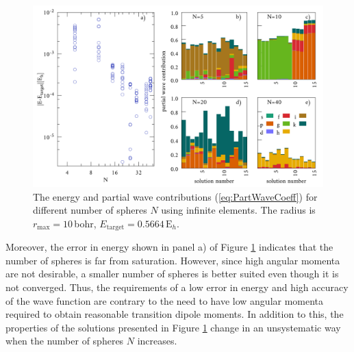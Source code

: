 \begin{figure}[h]
\includegraphics[width=\textwidth]{Figures/BC/NumInfEL}
\caption{The energy and partial wave contributions (\ref{eq:PartWaveCoeff}) for different number of spheres $N$ using infinite elements. The radius is $r_\text{max}=10\,$bohr, $E_\text{target}=0.5664\,\text{E}_h$.}
\label{fig:InfNum}
\end{figure}
Moreover, the error in energy shown in panel a) of Figure \ref{fig:InfNum} indicates that the number of spheres is far from saturation.
However, since high angular momenta are not desirable, a smaller number of spheres is better suited even though it is not converged.
Thus, the requirements of a low error in energy and high accuracy of the wave function are contrary to the need to have low angular momenta required to obtain reasonable transition dipole moments.
In addition to this, the properties of the solutions presented in Figure \ref{fig:InfNum} change in an unsystematic way when the number of spheres $N$ increases.
%


